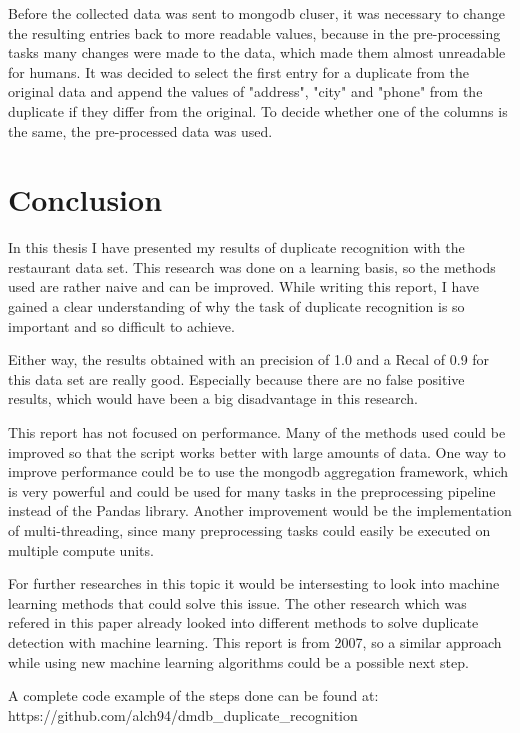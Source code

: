 \documentclass[conference]{IEEEtran}
\begin{document}
Before the collected data was sent to mongodb cluser, it was necessary to change the resulting entries back to more readable values, because in the pre-processing tasks many changes were made to the data, which made them almost unreadable for humans. It was decided to select the first entry for a duplicate from the original data and append the values of "address", "city" and "phone" from the duplicate if they differ from the original. To decide whether one of the columns is the same, the pre-processed data was used.

\section{Conclusion}
In this thesis I have presented my results of duplicate recognition with the restaurant data set. This research was done on a learning basis, so the methods used are rather naive and can be improved. While writing this report, I have gained a clear understanding of why the task of duplicate recognition is so important and so difficult to achieve.

Either way, the results obtained with an precision of 1.0 and a Recal of 0.9 for this data set are really good. Especially because there are no false positive results, which would have been a big disadvantage in this research.

This report has not focused on performance. Many of the methods used could be improved so that the script works better with large amounts of data. One way to improve performance could be to use the mongodb aggregation framework, which is very powerful and could be used for many tasks in the preprocessing pipeline instead of the Pandas library. Another improvement would be the implementation of multi-threading, since many preprocessing tasks could easily be executed on multiple compute units.

For further researches in this topic it would be intersesting to look into machine learning methods that could solve this issue. The other research which was refered in this paper\cite{bib:foreign_research} already looked into different methods to solve duplicate detection with machine learning. This report is from 2007, so a similar approach while using new machine learning algorithms could be a possible next step.

A complete code example of the steps done can be found at: https://github.com/alch94/dmdb\_duplicate\_recognition
\end{document}
